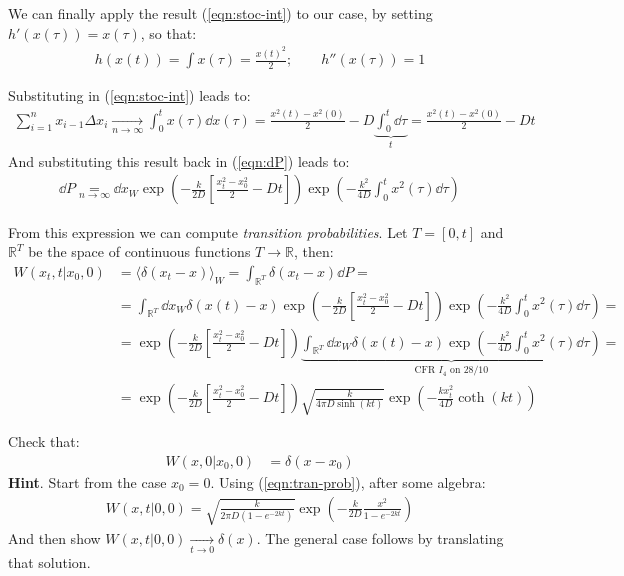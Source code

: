 \documentclass[../template.tex]{subfiles}
\begin{document}
We can finally apply the result (\ref{eqn:stoc-int}) to our case, by setting $h'(x(\tau)) = x(\tau)$, so that:
\begin{align*}
    h(x(t)) = \int x(\tau) =  \frac{x(t)^2}{2}; \qquad h''(x(\tau)) = 1
\end{align*}

Substituting in (\ref{eqn:stoc-int}) leads to:
\begin{align*}
    \sum_{i=1}^n x_{i-1} \Delta x_i  \xrightarrow[n \to \infty]{}  \int_0^t x(\tau) \dd{x(\tau)} = \frac{x^2(t) - x^2(0)}{2} - D\underbrace{\int_0^t \dd{\tau}}_{t} = \frac{x^2(t) - x^2(0)}{2} - Dt   
\end{align*}
And substituting this result back in (\ref{eqn:dP}) leads to:
\begin{align*}
    \dd{P} \underset{n \to \infty}{=}   \dd{x_W} \exp\left(-\frac{k}{2D} \left[\frac{x_t^2 - x_0^2}{2} - Dt \right] \right) \exp\left(-\frac{k^2}{4D} \int_0^t x^2(\tau) \dd{\tau} \right) 
\end{align*}

From this expression we can compute \textit{transition probabilities}. Let $T = [0,t]$ and $\mathbb{R}^T$ be the space of continuous functions $T \to \mathbb{R}$, then:
\begin{align} \nonumber
    W(x_t,t|x_0, 0) &= \langle \delta(x_t - x) \rangle_W = \int_{\mathbb{R}^T} \delta(x_t - x) \dd{P} =\\ \nonumber
    &= \int_{\mathbb{R}^T} \dd{x_W} \delta(x(t) - x) \exp\left(-\frac{k}{2 D} \left[\frac{x_t^2 - x_0^2}{2} - Dt\right]  \right) \exp\left(-\frac{k^2}{4 D} \int_0^t x^2(\tau) \dd{\tau} \right) =\\ \nonumber
    &= \exp\left(-\frac{k}{2D} \left[\frac{x_t^2 - x_0^2}{2} - Dt \right]\right) \underbrace{\int_{\mathbb{R}^T} \dd{x_W} \delta(x(t)-x) \exp\left(-\frac{k^2}{4 D} \int_0^t x^2(\tau) \dd{\tau} \right)}_{\text{CFR $I_4$ on 28/10}} =\\
    &= \exp\left(-\frac{k}{2D} \left[\frac{x_t^2 - x_0^2}{2} - Dt \right] \right) \sqrt{\frac{k}{4 \pi D \sinh (kt)} } \exp\left(-\frac{k x_t^2}{4 D} \coth(kt)\right)
    \label{eqn:tran-prob}
\end{align} 

\begin{exo}
    Check that:
    \begin{align*}
        W(x,0|x_0,0) &= \delta(x-x_0)
    \end{align*}
    \textbf{Hint}. Start from the case $x_0 = 0$. Using (\ref{eqn:tran-prob}), after some algebra:
    \begin{align}
        W(x,t|0,0) = \sqrt{\frac{k}{2 \pi D (1-e^{-2kt})} } \exp\left(-\frac{k}{2D} \frac{x^2}{1- e^{-2kt}}  \right)
        \label{eqn:tran-prob-simple}
    \end{align}
    And then show $W(x,t|0,0)  \xrightarrow[t \to 0]{} \delta(x)$. The general case follows by translating that solution. 
\end{exo}
\end{document}
